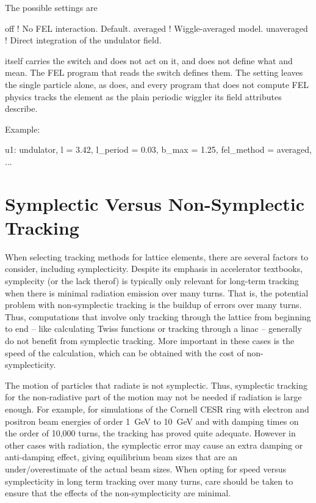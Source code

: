 The possible settings are
\begin{example}
  off             ! No FEL interaction. Default.
  averaged        ! Wiggle-averaged model.
  unaveraged      ! Direct integration of the undulator field.
\end{example}

\bmad itself carries the switch and does not act on it, and does not define what
 and  mean. The FEL program that reads the switch defines them.
The setting leaves the single particle  alone, as 
does, and every program that does not compute FEL physics tracks the element as the plain
periodic wiggler its field attributes describe.

Example:
\begin{example}
  u1: undulator, l = 3.42, l_period = 0.03, b_max = 1.25, fel_method = averaged, ...
\end{example}

\section{Symplectic Versus Non-Symplectic Tracking}
\label{s:non.symp}

When selecting tracking methods for lattice elements, there are several factors to consider,
including symplecticity. Despite its emphasis in accelerator textbooks, symplecity (or the lack
therof) is typically only relevant for long-term tracking when there is minimal radiation emission
over many turns. That is, the potential problem with non-symplectic tracking is the buildup of
errors over many turns. Thus, computations that involve only tracking through the lattice from
beginning to end -- like calculating Twiss functions or tracking through a linac -- generally do not
benefit from symplectic tracking. More important in these cases is the speed of the calculation, 
which can be obtained with the cost of non-symplecticity.

The motion of particles that radiate is not symplectic. Thus, symplectic tracking for the
non-radiative part of the motion may not be needed if radiation is large enough. For example, for
simulations of the Cornell CESR ring with electron and positron beam energies of order 1~GeV to
10~GeV and with damping times on the order of 10,000 turns, the  tracking has
proved quite adequate. However in other cases with radiation, the symplectic error may cause an 
extra damping or anti-damping effect, giving equilibrium beam sizes that are an under/overestimate 
of the actual beam sizes. When opting for speed versus symplecticity in long term tracking over 
many turns, care should be taken to ensure that the effects of the non-symplecticity are minimal.

